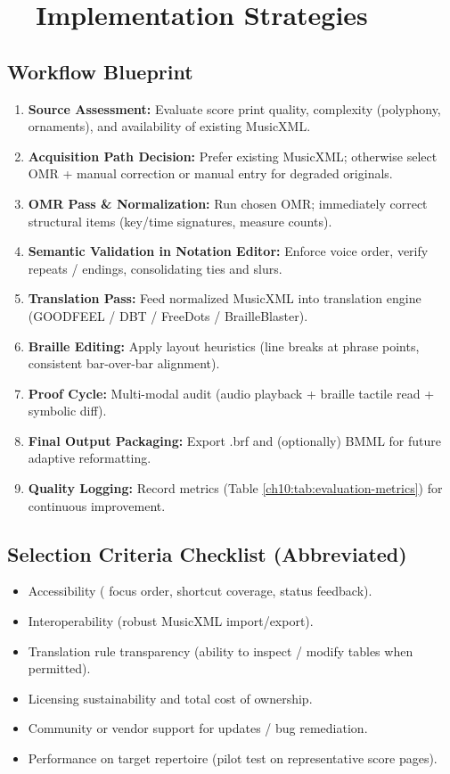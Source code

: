 \section{~~Implementation Strategies}\label{ch10:sec:implementation-strategies}
\subsection{Workflow Blueprint}
\begin{enumerate}
	\item \textbf{Source Assessment:} Evaluate score print quality, complexity (polyphony, ornaments), and availability of existing \gls{MusicXML}.
	\item \textbf{Acquisition Path Decision:} Prefer existing \gls{MusicXML}; otherwise select \gls{OMR} + manual correction or manual entry for degraded originals.
	\item \textbf{OMR Pass \& Normalization:} Run chosen OMR; immediately correct structural items (key/time signatures, measure counts).
	\item \textbf{Semantic Validation in Notation Editor:} Enforce voice order, verify repeats / endings, consolidating ties and slurs.
	\item \textbf{Translation Pass:} Feed normalized \gls{MusicXML} into translation engine (GOODFEEL / DBT / FreeDots / BrailleBlaster).
	\item \textbf{Braille Editing:} Apply layout heuristics (line breaks at phrase points, consistent bar-over-bar alignment).
	\item \textbf{Proof Cycle:} Multi-modal audit (audio playback + braille tactile read + symbolic diff).
	\item \textbf{Final Output Packaging:} Export .brf and (optionally) BMML for future adaptive reformatting.
	\item \textbf{Quality Logging:} Record metrics (Table \ref{ch10:tab:evaluation-metrics}) for continuous improvement.
\end{enumerate}

\subsection{Selection Criteria Checklist (Abbreviated)}
\begin{itemize}
	\item Accessibility ( focus order, shortcut coverage, status feedback).
	\item Interoperability (robust \gls{MusicXML} import/export).
	\item Translation rule transparency (ability to inspect / modify tables when permitted).
	\item Licensing sustainability and total cost of ownership.
	\item Community or vendor support for updates / bug remediation.
	\item Performance on target repertoire (pilot test on representative score pages).
\end{itemize}

